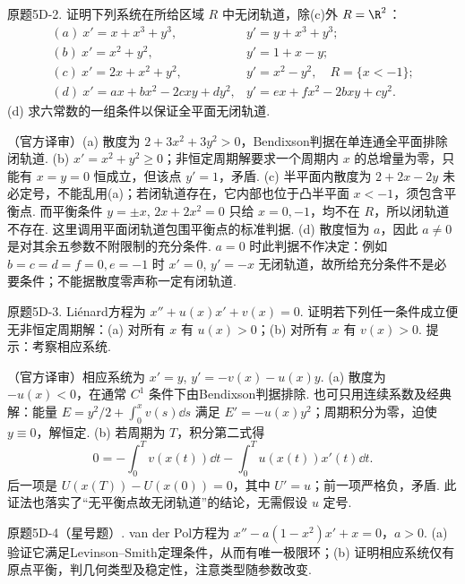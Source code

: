 \begin{exercise}\label{cw:bank-5D-2}原题5D-2. 证明下列系统在所给区域 $R$ 中无闭轨道，除(c)外 $R=\R^2$：
\[\begin{array}{ll}
(a)\ x'=x+x^3+y^3,&y'=y+x^3+y^3;\\
(b)\ x'=x^2+y^2,&y'=1+x-y;\\
(c)\ x'=2x+x^2+y^2,&y'=x^2-y^2,\quad R=\{x<-1\};\\
(d)\ x'=ax+bx^2-2cxy+dy^2,&y'=ex+fx^2-2bxy+cy^2.
\end{array}\]
(d) 求六常数的一组条件以保证全平面无闭轨道.\end{exercise}
\begin{solution}（官方译审）(a) 散度为 $2+3x^2+3y^2>0$，Bendixson判据在单连通全平面排除闭轨道. (b) $x'=x^2+y^2\ge0$；非恒定周期解要求一个周期内 $x$ 的总增量为零，只能有 $x=y=0$ 恒成立，但该点 $y'=1$，矛盾. (c) 半平面内散度为 $2+2x-2y$ 未必定号，不能乱用(a)；若闭轨道存在，它内部也位于凸半平面 $x<-1$，须包含平衡点. 而平衡条件 $y=\pm x$, $2x+2x^2=0$ 只给 $x=0,-1$，均不在 $R$，所以闭轨道不存在. 这里调用平面闭轨道包围平衡点的标准判据. (d) 散度恒为 $a$，因此 $a\ne0$ 是对其余五参数不附限制的充分条件. $a=0$ 时此判据不作决定：例如 $b=c=d=f=0,e=-1$ 时 $x'=0$, $y'=-x$ 无闭轨道，故所给充分条件不是必要条件；不能据散度零声称一定有闭轨道.\end{solution}
\begin{exercise}\label{cw:bank-5D-3}原题5D-3. Liénard方程为 $x''+u(x)x'+v(x)=0$. 证明若下列任一条件成立便无非恒定周期解：(a) 对所有 $x$ 有 $u(x)>0$；(b) 对所有 $x$ 有 $v(x)>0$. 提示：考察相应系统.\end{exercise}
\begin{solution}（官方译审）相应系统为 $x'=y$, $y'=-v(x)-u(x)y$. (a) 散度为 $-u(x)<0$，在通常 $C^1$ 条件下由Bendixson判据排除. 也可只用连续系数及经典解：能量 $E=y^2/2+\int_0^xv(s)\dd s$ 满足 $E'=-u(x)y^2$；周期积分为零，迫使 $y\equiv0$，解恒定. (b) 若周期为 $T$，积分第二式得
\[0=-\int_0^T v(x(t))\dd t-\int_0^T u(x(t))x'(t)\dd t.
\]
后一项是 $U(x(T))-U(x(0))=0$，其中 $U'=u$；前一项严格负，矛盾. 此证法也落实了“无平衡点故无闭轨道”的结论，无需假设 $u$ 定号.\end{solution}
\begin{exercise}\label{cw:bank-5D-4}原题5D-4（星号题）. van der Pol方程为 $x''-a(1-x^2)x'+x=0$，$a>0$. (a) 验证它满足Levinson--Smith定理条件，从而有唯一极限环；(b) 证明相应系统仅有原点平衡，判几何类型及稳定性，注意类型随参数改变.\end{exercise}
